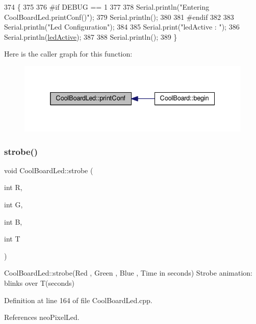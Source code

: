 \begin{DoxyCode}
374 \{
375 
376 \textcolor{preprocessor}{#if DEBUG == 1 }
377 
378     Serial.println(\textcolor{stringliteral}{"Entering CoolBoardLed.printConf()"});
379     Serial.println();
380 
381 \textcolor{preprocessor}{#endif}
382 
383     Serial.println(\textcolor{stringliteral}{"Led Configuration"});
384 
385     Serial.print(\textcolor{stringliteral}{"ledActive : "});
386     Serial.println(\hyperlink{classCoolBoardLed_a5f17c135516fcf4b44ea8a096ba0177a}{ledActive});
387 
388     Serial.println();   
389 \}
\end{DoxyCode}
Here is the caller graph for this function\+:\nopagebreak
\begin{figure}[H]
\begin{center}
\leavevmode
\includegraphics[width=332pt]{classCoolBoardLed_a8ed3053a36f0ed4a131f43b5b17efb61_icgraph}
\end{center}
\end{figure}
\mbox{\label{classCoolBoardLed_adc08c0ac07473499971c503d300f0413}} 
\subsubsection{\texorpdfstring{strobe()}{strobe()}}
{\footnotesize\ttfamily void Cool\+Board\+Led\+::strobe (\begin{DoxyParamCaption}\item[{int}]{R,  }\item[{int}]{G,  }\item[{int}]{B,  }\item[{int}]{T }\end{DoxyParamCaption})}

Cool\+Board\+Led\+::strobe(\+Red , Green , Blue , Time in seconds) Strobe animation\+: blinks over T(seconds) 

Definition at line 164 of file Cool\+Board\+Led.\+cpp.



References neo\+Pixel\+Led.


